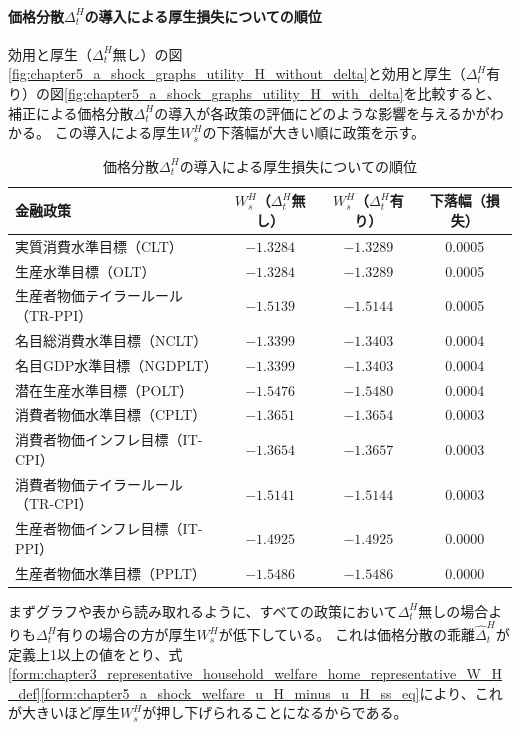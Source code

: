 
\paragraph{価格分散\(\Delta_t^H\)の導入による厚生損失についての順位}
\label{sec:chapter5_a_shock_delta}
効用と厚生（\(\Delta_t^H\)無し）の図\ref{fig:chapter5_a_shock_graphs_utility_H_without_delta}と効用と厚生（\(\Delta_t^H\)有り）の図\ref{fig:chapter5_a_shock_graphs_utility_H_with_delta}を比較すると、補正による価格分散\(\Delta_t^H\)の導入が各政策の評価にどのような影響を与えるかがわかる。
この導入による厚生\(W_s^H\)の下落幅が大きい順に政策を示す。
\begin{table}[H]
\centering
\caption{価格分散\(\Delta_t^H\)の導入による厚生損失についての順位}
\label{tab:chapter5_a_shock_delta}
\begin{tabular}{lccc}
\hline
金融政策 & \(W_s^H\)（\(\Delta_t^H\)無し） & \(W_s^H\)（\(\Delta_t^H\)有り） & 下落幅（損失） \\
\hline
実質消費水準目標（CLT） & $-1.3284$ & $-1.3289$ & 0.0005 \\
生産水準目標（OLT） & $-1.3284$ & $-1.3289$ & 0.0005 \\
生産者物価テイラールール（TR-PPI） & $-1.5139$ & $-1.5144$ & 0.0005 \\
名目総消費水準目標（NCLT） & $-1.3399$ & $-1.3403$ & 0.0004 \\
名目GDP水準目標（NGDPLT） & $-1.3399$ & $-1.3403$ & 0.0004 \\
潜在生産水準目標（POLT） & $-1.5476$ & $-1.5480$ & 0.0004 \\
消費者物価水準目標（CPLT） & $-1.3651$ & $-1.3654$ & 0.0003 \\
消費者物価インフレ目標（IT-CPI） & $-1.3654$ & $-1.3657$ & 0.0003 \\
消費者物価テイラールール（TR-CPI） & $-1.5141$ & $-1.5144$ & 0.0003 \\
生産者物価インフレ目標（IT-PPI） & $-1.4925$ & $-1.4925$ & 0.0000 \\
生産者物価水準目標（PPLT） & $-1.5486$ & $-1.5486$ & 0.0000 \\
\hline
\end{tabular}
\end{table}
まずグラフや表から読み取れるように、すべての政策において\(\Delta_t^H\)無しの場合よりも\(\Delta_t^H\)有りの場合の方が厚生\(W_s^H\)が低下している。
これは価格分散の乖離\(\hat{\Delta}_t^H\)が定義上1以上の値をとり、式\eqref{form:chapter3_representative_household_welfare_home_representative_W_H_def}\eqref{form:chapter5_a_shock_welfare_u_H_minus_u_H_ss_eq}により、これが大きいほど厚生\(W_s^H\)が押し下げられることになるからである。